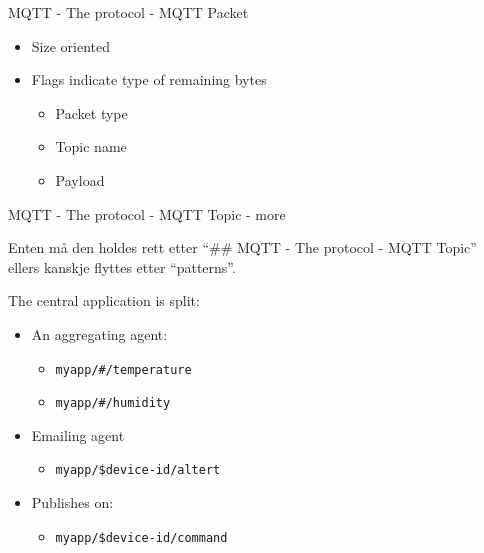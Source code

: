 \begin{frame}{MQTT - The protocol - MQTT Packet}
\protect\hypertarget{mqtt---the-protocol---mqtt-packet}{}

\begin{itemize}
\tightlist
\item
  Size oriented
\item
  Flags indicate type of remaining bytes

  \begin{itemize}
  \tightlist
  \item
    Packet type
  \item
    Topic name
  \item
    Payload
  \end{itemize}
\end{itemize}


\end{frame}

\begin{frame}[fragile]{MQTT - The protocol - MQTT Topic - more}
\protect\hypertarget{mqtt---the-protocol---mqtt-topic---more}{}

Enten må den holdes rett etter “\#\# MQTT - The protocol - MQTT Topic”
ellers kanskje flyttes etter “patterns”.

The central application is split:

\begin{itemize}
\tightlist
\item
  An aggregating agent:

  \begin{itemize}
  \tightlist
  \item
    \texttt{myapp/\#/temperature}
  \item
    \texttt{myapp/\#/humidity}
  \end{itemize}
\item
  Emailing agent

  \begin{itemize}
  \tightlist
  \item
    \texttt{myapp/\$device-id/altert}
  \end{itemize}
\item
  Publishes on:

  \begin{itemize}
  \tightlist
  \item
    \texttt{myapp/\$device-id/command}
  \end{itemize}
\end{itemize}

\note{}

\end{frame}

